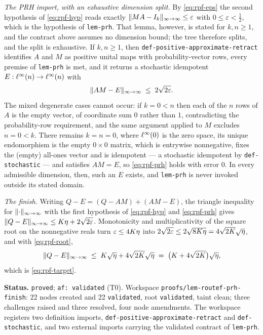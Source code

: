 \emph{The PRH import, with an exhaustive dimension split.} By \eqref{eq:rpf-eps} the second
hypothesis of \eqref{eq:rpf-hyp} reads exactly $\lVert MA-I_k \rVert_{\infty\to\infty}\le\varepsilon$ with
$0\le\varepsilon<\tfrac12$, which is the hypothesis of \texttt{lem-prh}. That lemma,
however, is stated for $k,n\ge1$, and the contract above assumes no dimension bound; the
tree therefore splits, and the split is exhaustive. If $k,n\ge1$, then
\texttt{def-positive-approximate-retract} identifies $A$ and $M$ as positive unital maps
with probability-vector rows, every premise of \texttt{lem-prh} is met, and it returns a
stochastic idempotent $E:\ell^{\infty}(n)\to\ell^{\infty}(n)$ with
\begin{equation}\label{eq:rpf-prh}
  \lVert AM-E \rVert_{\infty\to\infty}\;\le\;2\sqrt{2\varepsilon}.
\end{equation}
The mixed degenerate cases cannot occur: if $k=0<n$ then each of the $n$ rows of $A$ is the
empty vector, of coordinate sum $0$ rather than $1$, contradicting the probability-row
requirement, and the same argument applied to $M$ excludes $n=0<k$. There remains $k=n=0$,
where $\ell^{\infty}(0)$ is the zero space, its unique endomorphism is the empty $0\times0$
matrix, which is entrywise nonnegative, fixes the (empty) all-ones vector and is
idempotent --- a stochastic idempotent by \texttt{def-stochastic} --- and satisfies
$AM=E$, so \eqref{eq:rpf-prh} holds with error $0$. In every admissible dimension, then,
such an $E$ exists, and \texttt{lem-prh} is never invoked outside its stated domain.

\emph{The finish.} Writing $Q-E=(Q-AM)+(AM-E)$, the triangle inequality for
$\lVert \cdot \rVert_{\infty\to\infty}$ with the first hypothesis of \eqref{eq:rpf-hyp} and \eqref{eq:rpf-prh}
gives $\lVert Q-E \rVert_{\infty\to\infty}\le K\eta+2\sqrt{2\varepsilon}$. Monotonicity and multiplicativity of
the square root on the nonnegative reals turn $\varepsilon\le4K\eta$ into
$2\sqrt{2\varepsilon}\le2\sqrt{8K\eta}=4\sqrt{2K}\sqrt{\eta}$, and with
\eqref{eq:rpf-root},
\[
  \lVert Q-E \rVert_{\infty\to\infty}\;\le\;K\sqrt{\eta}+4\sqrt{2K}\sqrt{\eta}
  \;=\;\bigl(K+4\sqrt{2K}\bigr)\sqrt{\eta},
\]
which is \eqref{eq:rpf-target}.

\medskip
\noindent\textbf{Status.} \texttt{proved}; \texttt{af: validated} (T0). Workspace
\texttt{proofs/lem-routef-prh-finish}: 22 nodes created and 22 \texttt{validated}, root
\texttt{validated}, taint clean; three challenges raised and three resolved, four node
amendments. The workspace registers two definition imports,
\texttt{def-positive-approximate-retract} and \texttt{def-stochastic}, and two external
imports carrying the validated contract of \texttt{lem-prh}.

